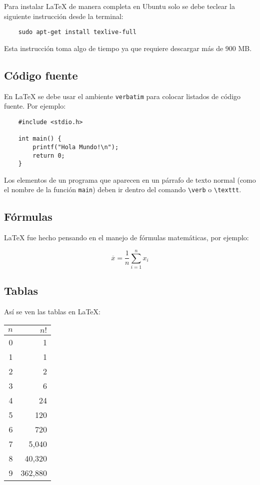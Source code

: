 \documentclass[10pt,letterpaper,oneside]{article}
\begin{document}
Para instalar {\LaTeX} de manera completa en Ubuntu solo se debe teclear la siguiente instrucción desde la terminal:

\begin{verbatim}
    sudo apt-get install texlive-full
\end{verbatim}

Esta instrucción toma algo de tiempo ya que requiere descargar más de 900 MB. 

\subsection{Código fuente}

En {\LaTeX} se debe usar el ambiente \verb!verbatim! para colocar listados de código fuente. Por ejemplo:  

\begin{verbatim}
    #include <stdio.h>
    
    int main() {
        printf("Hola Mundo!\n");
        return 0;
    }
\end{verbatim}

Los elementos de un programa que aparecen en un párrafo de texto normal (como el nombre de la función \verb!main!) deben ir dentro del comando \verb!\verb! o \verb!\texttt!.

\subsection{Fórmulas}

{\LaTeX} fue hecho pensando en el manejo de fórmulas matemáticas, por ejemplo:

\begin{displaymath}
\overline{x} = \frac{1}{n}\sum_{i=1}^n x_{i}
\end{displaymath}

\subsection{Tablas}

Así se ven las tablas en {\LaTeX}:

\begin{center}

    \begin{tabular}{|r|r|}
    \hline
    \hline
    $n$ & $n!$  \\
    \hline
    \hline
    0 & 1         \\
    1 & 1         \\
    2 & 2         \\
    3 & 6         \\
    4 & 24        \\
    5 & 120       \\
    6 & 720       \\
    7 & 5,040      \\
    8 & 40,320     \\
    9 & 362,880    \\    
    \hline
    \end{tabular}
    
\end{center}    
    
\end{document}
